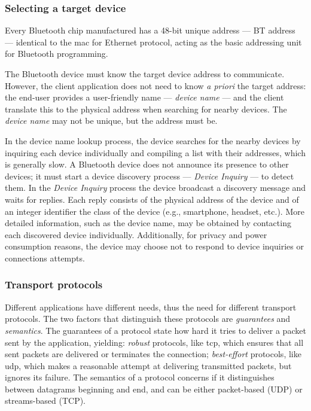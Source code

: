 \subsubsection{Selecting a target device}%
\label{sec:bt-target-device}
Every Bluetooth chip manufactured has a 48-bit unique address --- BT address ---
identical to the \gls{mac} for Ethernet protocol, acting as the basic addressing
unit for Bluetooth programming.

The Bluetooth device must know the target device address to
communicate. However, the client application does not need to know \textit{a
  priori} the target address: the end-user provides a user-friendly name ---
\textit{device name} --- and the client translate this to the physical address
when searching for nearby devices. The \textit{device name} may not be unique,
but the address must be.

In the device name lookup process, the device searches for the nearby devices by
inquiring each device individually and compiling a list with their addresses,
which is generally slow. A
Bluetooth device does not announce its presence to other devices; it must start
a device discovery process --- \textit{Device Inquiry} --- to detect them. In
the \textit{Device Inquiry} process the device broadcast a discovery message and
waits for replies. Each reply consists of the physical address of the device and
of an integer identifier the class of the device (e.g., smartphone, headset,
etc.). More detailed information, such as the device name, may be obtained by
contacting each discovered device individually. Additionally, for privacy and
power consumption reasons, the device may choose not to respond to device
inquiries or connections attempts.
%
\subsubsection{Transport protocols}%
\label{sec:bt-transport-protocols}
%
Different applications have different needs, thus the need for different
transport protocols. The two factors that distinguish these protocols are
\textit{guarantees} and \textit{semantics}. The guarantees of a protocol state
how hard it tries to deliver a packet sent by the application, yielding:
\emph{robust} protocols, like \gls{tcp}, which ensures that all sent packets are
delivered or terminates the connection; \emph{best-effort} protocols, like \gls{udp},
which makes a reasonable attempt at delivering transmitted packets, but ignores
its failure. The semantics of a protocol concerns if it distinguishes between
datagrams beginning and end, and can be either packet-based (UDP) or
streams-based (TCP).

